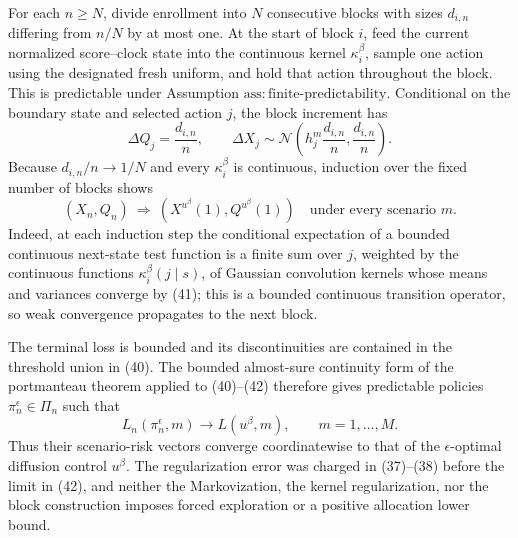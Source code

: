 For each \(n\geq N\), divide enrollment into \(N\) consecutive blocks with sizes \(d_{i,n}\) differing from \(n/N\) by at most one.  At the start of block \(i\), feed the current normalized score--clock state into the continuous kernel \(\kappa_i^\beta\), sample one action using the designated fresh uniform, and hold that action throughout the block.  This is predictable under Assumption \(\mathrm{ass{:}finite\text{-}predictability}\).  Conditional on the boundary state and selected action \(j\), the block increment has
\[
 \Delta Q_j=\frac{d_{i,n}}n,
 \qquad
 \Delta X_j\sim\mathcal N\!\left(h_j^m\frac{d_{i,n}}n,
                                      \frac{d_{i,n}}n\right).    \tag{41}
\]
Because \(d_{i,n}/n\to1/N\) and every \(\kappa_i^\beta\) is continuous, induction over the fixed number of blocks shows
\[
 (X_n,Q_n)\ \Longrightarrow\ (X^{u^\beta}(1),Q^{u^\beta}(1))
 \quad\text{under every scenario }m.                            \tag{42}
\]
Indeed, at each induction step the conditional expectation of a bounded continuous next-state test function is a finite sum over \(j\), weighted by the continuous functions \(\kappa_i^\beta(j\mid s)\), of Gaussian convolution kernels whose means and variances converge by (41); this is a bounded continuous transition operator, so weak convergence propagates to the next block.

The terminal loss is bounded and its discontinuities are contained in the threshold union in (40).  The bounded almost-sure continuity form of the portmanteau theorem applied to (40)--(42) therefore gives predictable policies \(\pi_n^\epsilon\in\Pi_n\) such that
\[
 L_n(\pi_n^\epsilon,m)\longrightarrow L(u^\beta,m),
 \qquad m=1,\ldots,M.                                           \tag{43}
\]
Thus their scenario-risk vectors converge coordinatewise to that of the \(\epsilon\)-optimal diffusion control \(u^\beta\).  The regularization error was charged in (37)--(38) before the limit in (42), and neither the Markovization, the kernel regularization, nor the block construction imposes forced exploration or a positive allocation lower bound.
